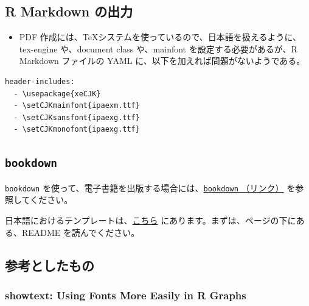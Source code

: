 \documentclass[
  xelatex, ja=standard]{bxjsbook}
\providecommand{\tightlist}{%
  \setlength{\itemsep}{0pt}\setlength{\parskip}{0pt}}
\theoremstyle{definition}
\theoremstyle{definition}
\theoremstyle{definition}
\theoremstyle{definition}
\theoremstyle{remark}
\begin{document}
\hypertarget{r-markdown-ux306eux51faux529b}{%
\subsection{R Markdown の出力}\label{r-markdown-ux306eux51faux529b}}

\begin{itemize}
\tightlist
\item
  PDF 作成には、\TeX システムを使っているので、日本語を扱えるように、tex-engine や、document class や、mainfont を設定する必要があるが、R Markdown ファイルの YAML に、以下を加えれば問題がないようである。
\end{itemize}

\begin{verbatim}
header-includes:
  - \usepackage{xeCJK}
  - \setCJKmainfont{ipaexm.ttf}
  - \setCJKsansfont{ipaexg.ttf}
  - \setCJKmonofont{ipaexg.ttf}
\end{verbatim}

\hypertarget{bookdown}{%
\subsection{\texorpdfstring{\texttt{bookdown}}{bookdown}}\label{bookdown}}

\texttt{bookdown} を使って、電子書籍を出版する場合には、\href{https://bookdown.org/yihui/bookdown/}{\texttt{bookdown} （リンク）} を参照してください。

日本語におけるテンプレートは、\href{https://github.com/icu-hsuzuki/bs4_book_template}{こちら} にあります。まずは、ページの下にある、README を読んでください。

\hypertarget{ux53c2ux8003ux3068ux3057ux305fux3082ux306e}{%
\subsection{参考としたもの}\label{ux53c2ux8003ux3068ux3057ux305fux3082ux306e}}

\hypertarget{showtext-using-fonts-more-easily-in-r-graphs}{%
\subsubsection{showtext: Using Fonts More Easily in R Graphs}\label{showtext-using-fonts-more-easily-in-r-graphs}}
\end{document}
